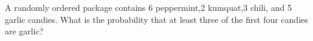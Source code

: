 A randomly ordered package contains 6 peppermint,2 kumquat,3 chili, and 5 garlic candies. What is the probability that at least three of the first four candies are garlic?
